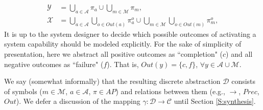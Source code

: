 \begin{subequations}
	\label{ActOutAP}
	\begin{align}
		\mathcal{Y} &= \bigcup \limits_{a \in \mathcal{A}} \pi_a \cup \bigcup \limits_{m \in \mathcal{M}} \pi_m,\\
		\mathcal{X} &= 
		\bigcup \limits_{a \in \mathcal{A}} \bigcup \limits_{o \in Out(a)} \pi_a^o \cup \bigcup \limits_{m \in \mathcal{M}} \bigcup \limits_{o \in Out(m)} \pi_m^o,
	\end{align}
\end{subequations}
It is up to the system designer to decide which possible outcomes of activating a system capability should be modeled explicitly.
For the sake of simplicity of presentation, here we abstract all positive outcomes as ``completion" ($c$) and all negative outcomes as ``failure" ($f$). 
That is, $Out(y) = \{ c, f \}$, $\forall y \in \mathcal{A} \cup \mathcal{M}$.

We say (somewhat informally) that the resulting discrete abstraction $\mathcal{D}$ consists of symbols ($m \in \mathcal{M}$, $a \in \mathcal{A}$, $\pi \in AP$) and relations between them (e.g., $\boldsymbol\rightarrow$, $Prec$, $Out$).
We defer a discussion of the mapping $\gamma: \mathcal{D} \rightarrow \mathcal{C}$ until Section \ref{S:synthesis}.

